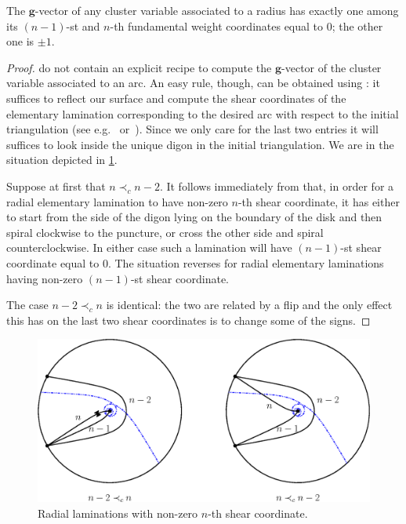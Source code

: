 \documentclass[pdftex]{sigma}
\numberwithin{equation}{section}
\numberwithin{theorem}{section}
\numberwithin{proposition}{section}
\numberwithin{lemma}{section}
\numberwithin{corollary}{section}
\numberwithin{definition}{section}
\numberwithin{example}{section}
\numberwithin{remark}{section}
\numberwithin{note}{section}
\newcommand{\bg}{\mathbf{g}}
\begin{document}
  \begin{lemma}
    \label{lem:g-vector-of-radii}
    The $\bg$-vector of any cluster variable associated to a radius has exactly one among its $(n-1)$-st and $n$-th fundamental weight coordinates equal to $0$; the other one is $\pm 1$.
  \end{lemma}
  \begin{proof}
    \cite{FST08,FT12} do not contain an explicit recipe to compute the $\bg$-vector of the cluster variable associated to an arc.
    An easy rule, though, can be obtained using \cite[Eq. (1.13)]{NZ12}: it suffices to reflect our surface and compute the shear coordinates of the elementary lamination corresponding to the desired arc with respect to the initial triangulation (see e.g.~\cite[Prop. 5.2]{Re14} or~\cite[Lemma 8.6]{FeTu15}).
    Since we only care for the last two entries it will suffices to look inside the unique digon in the initial triangulation.
    We are in the situation depicted in \cref{fig:D_n-weights}.

    Suppose at first that $n \prec_c n-2$.
    It follows immediately from \cite[Fig. 36]{FT12} that, in order for a radial elementary lamination to have non-zero $n$-th shear coordinate, it has either to start from the side of the digon lying on the boundary of the disk and then spiral clockwise to the puncture, or cross the other side and spiral counterclockwise.
    In either case such a lamination will have $(n-1)$-st shear coordinate equal to $0$.
    The situation reverses for radial elementary laminations having non-zero $(n-1)$-st shear coordinate.

    The case $n-2 \prec_c n$ is identical: the two are related by a flip and the only effect this has on the last two shear coordinates is to change some of the signs.
  \end{proof}

  \begin{figure}
    \begin{center}
      \includegraphics[scale=0.7]{D_n-weights.eps}
    \end{center}
    \caption{Radial laminations with non-zero $n$-th shear coordinate.}
    \label{fig:D_n-weights}
  \end{figure}
\end{document}
